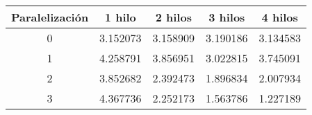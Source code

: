 \begin{tabular}{|c|c|c|c|c|}
\hline \textbf{Paralelización} & \textbf{1 hilo} & \textbf{2 hilos} & \textbf{3 hilos} & \textbf{4 hilos
}\\ 
\hline 0 & 3.152073 & 3.158909 & 3.190186 & 3.134583
\\ 
\hline 1 & 4.258791 & 3.856951 & 3.022815 & 3.745091
\\ 
\hline 2 & 3.852682 & 2.392473 & 1.896834 & 2.007934
\\ 
\hline 3 & 4.367736 & 2.252173 & 1.563786 & 1.227189
\\ 
\hline\end{tabular}